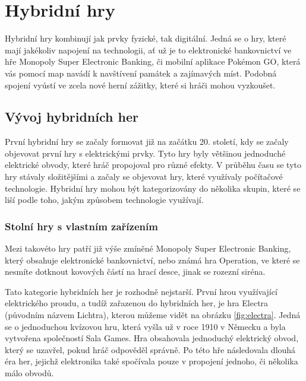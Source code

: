 \chapter{Hybridní hry}
Hybridní hry kombinují jak prvky fyzické, tak digitální. Jedná se o hry, které mají jakékoliv napojení na technologii, ať už je to elektronické bankovnictví ve hře Monopoly Super Electronic Banking, či mobilní aplikace Pokémon GO, která vás pomocí map navádí k navštívení památek a zajímavých míst. Podobná spojení vyústí ve zcela nové herní zážitky, které si hráči mohou vyzkoušet.\cite{hybrid_board_games_design}

\section{Vývoj hybridních her}
První hybridní hry se začaly formovat již na začátku 20. století, kdy se začaly objevovat první hry s elektrickými prvky. Tyto hry byly většinou jednoduché elektrické obvody, které hráč propojoval pro různé efekty. V průběhu času se tyto hry stávaly složitějšími a začaly se objevovat hry, které využívaly počítačové technologie. Hybridní hry mohou být kategorizovány do několika skupin, které se liší podle toho, jakým způsobem technologie využívají.\cite{history_of_hybrid_games}

\subsection{Stolní hry s vlastním zařízením}
Mezi takovéto hry patří již výše zmíněné Monopoly Super Electronic Banking, který obsahuje elektronické bankovnictví, nebo známá hra Operation, ve které se nesmíte dotknout kovových částí na hrací desce, jinak se rozezní siréna. 

Tato kategorie hybridních her je rozhodně nejstarší. První hrou využívající elektrického proudu, a tudíž zařazenou do hybridních her, je hra Electra (původním názvem Lichtra), kterou můžeme vidět na obrázku \ref{fig:electra}. Jedná se o jednoduchou kvízovou hru, která vyšla už v roce 1910 v Německu a byla vytvořena společností Sala Games. Hra obsahovala jednoduchý elektrický obvod, který se uzavřel, pokud hráč odpověděl správně. Po této hře následovala dlouhá éra her, jejichž elektronika také spočívala pouze v propojení jednoho, či několika málo obvodů.\cite{history_of_hybrid_games, boardgames_with_apps}

